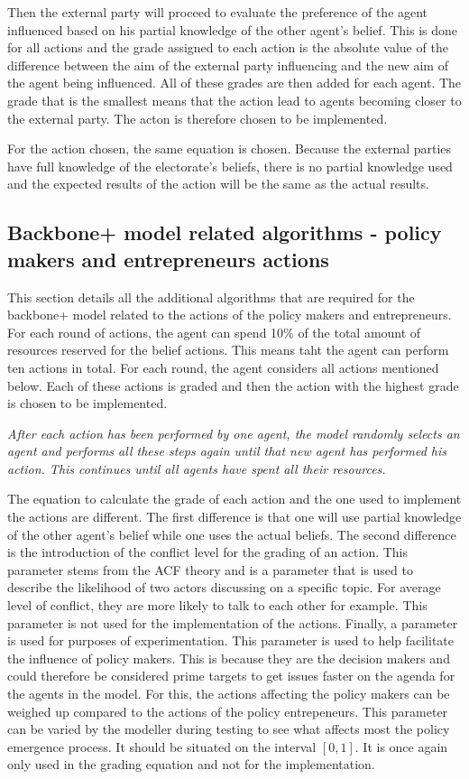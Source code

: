 Then the external party will proceed to evaluate the preference of the agent influenced based on his partial knowledge of the other agent's belief. This is done for all actions and the grade assigned to each action is the absolute value of the difference between the aim of the external party influencing and the new aim of the agent being influenced. All of these grades are then added for each agent. The grade that is the smallest means that the action lead to agents becoming closer to the external party. The acton is therefore chosen to be implemented.

For the action chosen, the same equation is chosen. Because the external parties have full knowledge of the electorate's beliefs, there is no partial knowledge used and the expected results of the action will be the same as the actual results. 

\subsection{Backbone+ model related algorithms - policy makers and entrepreneurs actions}

This section details all the additional algorithms that are required for the backbone+ model related to the actions of the policy makers and entrepreneurs. For each round of actions, the agent can spend 10\% of the total amount of resources reserved for the belief actions. This means taht the agent can perform ten actions in total. For each round, the agent considers all actions mentioned below. Each of these actions is graded and then the action with the highest grade is chosen to be implemented.

\emph{After each action has been performed by one agent, the model randomly selects an agent and performs all these steps again until that new agent has performed his action. This continues until all agents have spent all their resources.}

The equation to calculate the grade of each action and the one used to implement the actions are different. The first difference is that one will use partial knowledge of the other agent's belief while one uses the actual beliefs. The second difference is the introduction of the conflict level for the grading of an action. This parameter stems from the ACF theory and is a parameter that is used to describe the likelihood of two actors discussing on a specific topic. For average level of conflict, they are more likely to talk to each other for example. This parameter is not used for the implementation of the actions. Finally, a parameter is used for purposes of experimentation. This parameter is used to help facilitate the influence of policy makers. This is because they are the decision makers and could therefore be considered prime targets to get issues faster on the agenda for the agents in the model. For this, the actions affecting the policy makers can be weighed up compared to the actions of the policy entrepeneurs. This parameter can be varied by the modeller during testing to see what affects most the policy emergence process. It should be situated on the interval $[0,1]$. It is once again only used in the grading equation and not for the implementation.

